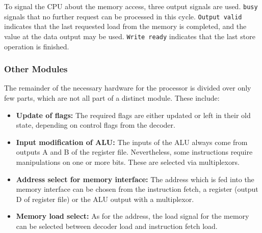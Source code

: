 To signal the CPU about the memory access, three output signals are used. \texttt{busy} signals that no further request can be processed in this cycle. \texttt{Output valid} indicates that the last requested load from the memory is completed, and the value at the data output may be used. \texttt{Write ready} indicates that the last store operation is finished. 

\subsubsection{Other Modules}
\label{subsubsec:othermodules}

The remainder of the necessary hardware for the processor is divided over only few parts, which are not all part of a distinct module. These include:
\begin{itemize}
\item \textbf{Update of flags: }The required flags are either updated or left in their old state, depending on control flags from the decoder.
\item \textbf{Input modification of ALU:} The inputs of the ALU always come from outputs A and B of the register file. Nevertheless, some instructions require manipulations on one or more bits. These are selected via multiplexors.
\item \textbf{Address select for memory interface:} The address which is fed into the memory interface can be chosen from the instruction fetch, a register (output D of register file) or the ALU output with a multiplexor.
\item \textbf{Memory load select:} As for the address, the load signal for the memory can be selected between decoder load and instruction fetch load.
\end{itemize}

